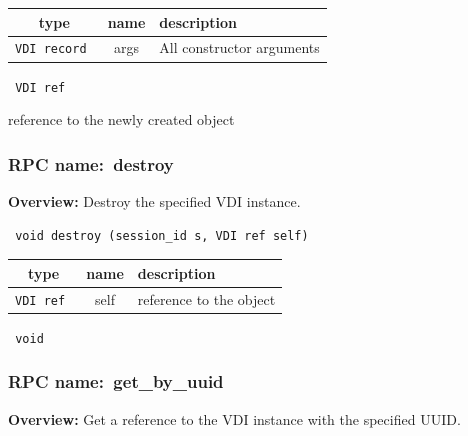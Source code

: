  
\vspace{0.3cm}
\begin{tabular}{|c|c|p{7cm}|}
 \hline
{\bf type} & {\bf name} & {\bf description} \\ \hline
{\tt VDI record } & args & All constructor arguments \\ \hline 

\end{tabular}

\vspace{0.3cm}

{\tt 
VDI ref
}


reference to the newly created object
\vspace{0.3cm}
\vspace{0.3cm}
\vspace{0.3cm}
\subsubsection{RPC name:~destroy}

{\bf Overview:} 
Destroy the specified VDI instance.

\begin{verbatim} void destroy (session_id s, VDI ref self)\end{verbatim}



 
\vspace{0.3cm}
\begin{tabular}{|c|c|p{7cm}|}
 \hline
{\bf type} & {\bf name} & {\bf description} \\ \hline
{\tt VDI ref } & self & reference to the object \\ \hline 

\end{tabular}

\vspace{0.3cm}

{\tt 
void
}



\vspace{0.3cm}
\vspace{0.3cm}
\vspace{0.3cm}
\subsubsection{RPC name:~get\_by\_uuid}

{\bf Overview:} 
Get a reference to the VDI instance with the specified UUID.

